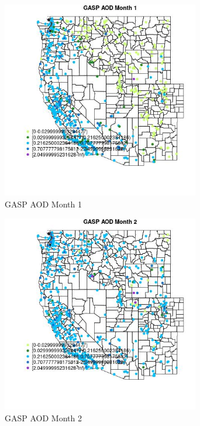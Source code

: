 \begin{figure} 
\centering  
\includegraphics[width=0.77\textwidth]{Code_Outputs/Report_ML_input_PM25_Step4_part_e_de_duplicated_aves_compiled_2019-05-21wNAs_MapObsMo1GASP_AOD.jpg} 
\caption{\label{fig:Report_ML_input_PM25_Step4_part_e_de_duplicated_aves_compiled_2019-05-21wNAsMapObsMo1GASP_AOD}GASP AOD Month 1} 
\end{figure} 
 

\begin{figure} 
\centering  
\includegraphics[width=0.77\textwidth]{Code_Outputs/Report_ML_input_PM25_Step4_part_e_de_duplicated_aves_compiled_2019-05-21wNAs_MapObsMo2GASP_AOD.jpg} 
\caption{\label{fig:Report_ML_input_PM25_Step4_part_e_de_duplicated_aves_compiled_2019-05-21wNAsMapObsMo2GASP_AOD}GASP AOD Month 2} 
\end{figure} 
 


